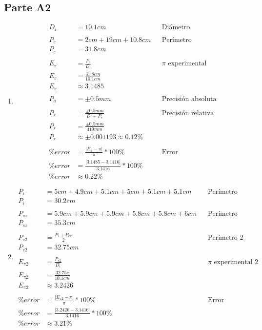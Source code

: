 \subsection{Parte A2}%
\label{sub:proce_parte_a2}

\begin{enumerate}
	\item
		\begin{align*}
			D_i &= 10.1cm && \text{Diámetro}\\
			\\
			P_e  &= 2cm+19cm+10.8cm && \text{Perímetro}\\
			P_e &= 31.8cm\\
			\\
			E_\pi &= \frac{P_e}{D_i} && \text{$\pi$ experimental}\\
			E_\pi &= \frac{31.8cm}{10.1cm} \\
			E_\pi &\approx 3.1485 \\
			\\
			P_a &= \pm0.5mm && \text{Precisión absoluta}\\
			\\
			P_r &= \frac{\pm0.5mm}{D_i+P_e} && \text{Precisión relativa}\\
			P_r &= \frac{\pm0.5mm}{419mm} \\
			P_r &\approx \pm0.001193 \approx 0.12\%\\
			\\
			\%error &= \frac{|E_\pi-\pi|}{\pi} * 100\% && \text{Error}\\
			\%error &= \frac{|3.1485-3.1416|}{3.1416} * 100\%\\
			\%error &\approx 0.22\%
		\end{align*}
	\item
		\begin{align*}
			P_i &= 5cm+4.9cm+5.1cm+5cm+5.1cm+5.1cm && \text{Perímetro interior}\\
			P_i &= 30.2cm\\
			\\
			P_{ex} &= 5.9cm+5.9cm+5.9cm+5.8cm+5.8cm+6cm && \text{Perímetro exterior}\\
			P_{ex} &= 35.3cm\\
			\\
			P_{e2} &= \frac{P_i+P_{ex}}{2} && \text{Perímetro 2}\\
			P_{e2} &= 32.75cm\\
			\\
			E_{\pi2} &= \frac{P_{e2}}{D_i} && \text{$\pi$ experimental 2}\\
			E_{\pi2} &= \frac{32.75c}{10.1cm} \\
			E_{\pi2} &\approx 3.2426\\
			\\
			\%error &= \frac{|E_{\pi2}-\pi|}{\pi} * 100\% && \text{Error}\\
			\%error &= \frac{|3.2426-3.1416|}{3.1416} * 100\% \\
			\%error &\approx 3.21\%
		\end{align*}
\end{enumerate}
